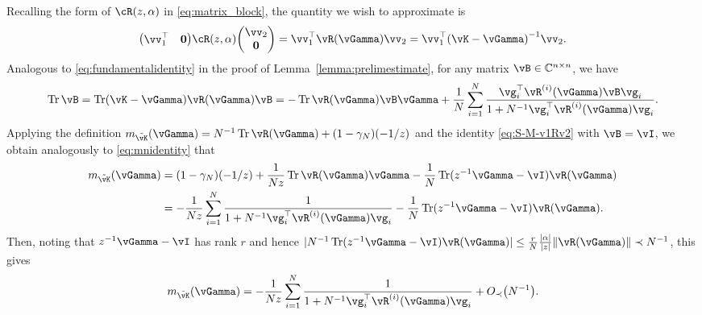 \begin{proof-of-lemma}
	Recalling the form of $\vcR(z,\alpha)$ in \eqref{eq:matrix_block},
the quantity we wish to approximate is
	\begin{align*}
		\begin{pmatrix}
			\vv_1^\top&\mathbf{0}
		\end{pmatrix}\vcR(z,\alpha)\begin{pmatrix}
			\vv_2\\
			\mathbf{0}
		\end{pmatrix}=\vv_1^\top\vR(\vGamma)\vv_2=\vv^\top_1\left(\vK-\vGamma\right)^{-1}\vv_2.
	\end{align*}
	Analogous to \eqref{eq:fundamentalidentity} in the proof of Lemma~\ref{lemma:prelimestimate}, 
	for any matrix $\vB\in \C^{n\times n}$, we have
	\begin{align}
		\Tr \vB=
\Tr (\vK-\vGamma)\vR(\vGamma)\vB={-}\Tr \vR(\vGamma)\vB\vGamma+\frac{1}{N}\sum_{i=1}^N
\frac{\vg_i^\top\vR^{(i)}(\vGamma)\vB\vg_i}{1+N^{-1}\vg_i^\top\vR^{(i)}(\vGamma)\vg_i}.\label{eq:S-M-v1Rv2}
	\end{align}
Applying the definition
$m_{\tilde \vK}(\vGamma)=N^{-1}\Tr \vR(\vGamma) +(1-\gamma_N)(-1/z)$
and the identity \eqref{eq:S-M-v1Rv2} with $\vB=\vI$, we obtain analogously to
\eqref{eq:mnidentity} that
	\begin{align*}
m_{\tilde \vK}(\vGamma)
&=(1-\gamma_N)(-1/z)+\frac{1}{Nz}\Tr \vR(\vGamma)\vGamma
-\frac{1}{N}\Tr (z^{-1}\vGamma-\vI)\vR(\vGamma)\notag\\
&={-}\frac{1}{Nz}\sum_{i=1}^N\frac{1}{1+N^{-1}\vg_i^\top\vR^{(i)}(\vGamma)\vg_i}
-\frac{1}{N}\Tr (z^{-1}\vGamma-\vI)\vR(\vGamma).
	\end{align*}
Then, noting that $z^{-1}\vGamma-\vI$ has rank $r$ and hence
$|N^{-1}\Tr(z^{-1}\vGamma-\vI)\vR(\vGamma)|
\leq \frac{r}{N}\frac{|\alpha|}{|z|}\|\vR(\vGamma)\| \prec N^{-1}$, this gives
\begin{equation}\label{eq:S-M-TrR}
m_{\tilde \vK}(\vGamma)
={-}\frac{1}{Nz}\sum_{i=1}^N \frac{1}{1+N^{-1}\vg_i^\top\vR^{(i)}(\vGamma)\vg_i}
+\SD{N^{-1}}.
\end{equation}


\end{proof-of-lemma}
